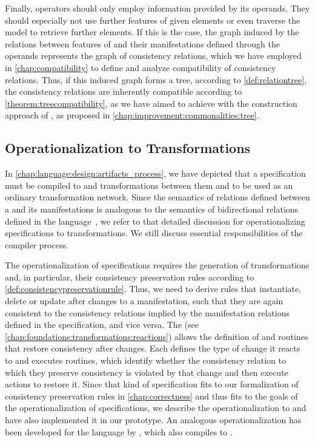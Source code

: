 Finally, operators should only employ information provided by its operands.
They should especially not use further features of given elements or even traverse the model to retrieve further elements.
If this is the case, the graph induced by the relations between features of \commonalities and their manifestations defined through the operands represents the graph of consistency relations, which we have employed in \autoref{chap:compatibility} to define and analyze compatibility of consistency relations.
Thus, if this induced graph forms a tree, according to \autoref{def:relationtree}, the consistency relations are inherently compatible according to \autoref{theorem:treecompatibility}, as we have aimed to achieve with the construction approach of \commonalities, as proposed in \autoref{chap:improvement:commonalities:tree}.


\subsection{Operationalization to Transformations}
\label{chap:language:commonalities:operationalization}

In \autoref{chap:language:design:artifacts_process}, we have depicted that a \commonalities specification must be compiled to \conceptmetamodels and transformations between them and \concretemetamodels to be used as an ordinary transformation network.
Since the semantics of relations defined between a \commonality and its manifestations is analogous to the semantics of bidirectional relations defined in the \mappings language~\cite[Chap.~7]{kramer2017a}, we refer to that detailed discussion for operationalizing \commonalities specifications to transformations.
We still discuss essential responsibilities of the compiler process.

The operationalization of \commonalities specifications requires the generation of transformations and, in particular, their consistency preservation rules according to \autoref{def:consistencypreservationrule}.
Thus, we need to derive rules that instantiate, delete or update \commonalities after changes to a manifestation, such that they are again consistent to the consistency relations implied by the manifestation relations defined in the \commonalities specification, and vice versa.
The \reactionslanguage (see \autoref{chap:foundations:transformations:reactions}) allows the definition of \reactions and routines that restore consistency after changes.
Each \reaction defines the type of change it reacts to and executes routines, which identify whether the consistency relation to which they preserve consistency is violated by that change and then execute actions to restore it.
Since that kind of specification fits to our formalization of consistency preservation rules in \autoref{chap:correctness} and thus fits to the goals of the operationalization of \commonalities specifications, we describe the operationalization to \reactions and have also implemented it in our prototype.
An analogous operationalization has been developed for the \mappings language by \textcite[Sec. 7.7]{kramer2017a}, which also compiles to \reactions.

